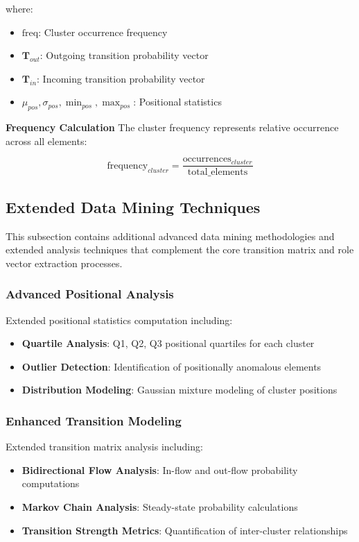 where:
\begin{itemize}
    \item $\text{freq}$: Cluster occurrence frequency
    \item $\mathbf{T}_{out}$: Outgoing transition probability vector
    \item $\mathbf{T}_{in}$: Incoming transition probability vector  
    \item $\mu_{pos}, \sigma_{pos}, \min_{pos}, \max_{pos}$: Positional statistics
\end{itemize}

\textbf{Frequency Calculation}
The cluster frequency represents relative occurrence across all elements:

\begin{equation}
\text{frequency}_{cluster} = \frac{\text{occurrences}_{cluster}}{\text{total\_elements}}
\end{equation}

\subsection{Extended Data Mining Techniques}
\label{subsec:more-data-mining}

This subsection contains additional advanced data mining methodologies and extended analysis techniques that complement the core transition matrix and role vector extraction processes.

\subsubsection{Advanced Positional Analysis}
Extended positional statistics computation including:
\begin{itemize}
    \item \textbf{Quartile Analysis}: Q1, Q2, Q3 positional quartiles for each cluster
    \item \textbf{Outlier Detection}: Identification of positionally anomalous elements
    \item \textbf{Distribution Modeling}: Gaussian mixture modeling of cluster positions
\end{itemize}

\subsubsection{Enhanced Transition Modeling}
Extended transition matrix analysis including:
\begin{itemize}
    \item \textbf{Bidirectional Flow Analysis}: In-flow and out-flow probability computations
    \item \textbf{Markov Chain Analysis}: Steady-state probability calculations
    \item \textbf{Transition Strength Metrics}: Quantification of inter-cluster relationships
\end{itemize}

